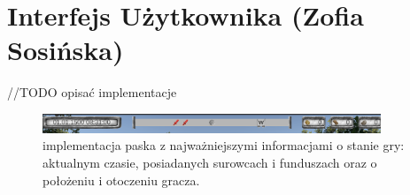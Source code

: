 \section{Interfejs Użytkownika (Zofia Sosińska)}\label{chap:ui}
//TODO opisać implementacje

\begin{figure}[htbp]
    \centering
    \includegraphics[width=0.9\textwidth]{images/ui/naszpasek.png}
    \caption{implementacja paska z najważniejszymi informacjami o stanie gry: aktualnym czasie, posiadanych surowcach i funduszach oraz o położeniu i otoczeniu gracza.
    }\label{fig:compass}
\end{figure}
 
